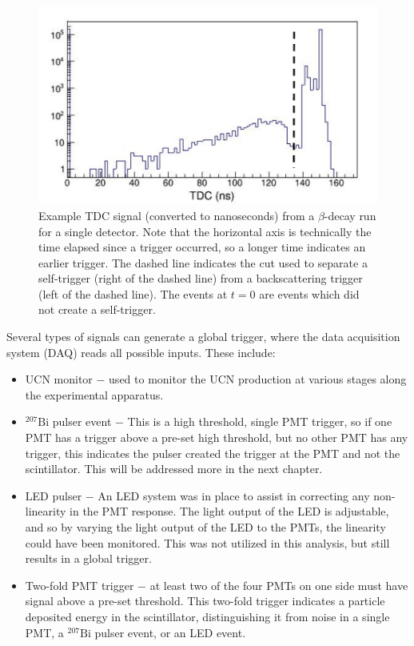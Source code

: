 \begin{figure}
  \centering
  \includegraphics[page=1,scale=0.60]{2-UCNAExperiment/TDCSignal.pdf}
  \caption{Example TDC signal (converted to nanoseconds) from a $\beta$-decay run for a single
    detector.
    Note that the horizontal axis is technically the time elapsed since a trigger occurred,
    so a longer time indicates an earlier
    trigger. The dashed line
    indicates the cut used to separate a self-trigger (right of the dashed line) from a backscattering trigger
    (left of the dashed line).  The events at $t=0$ are events which did not create a self-trigger.}
  \label{fig:TDCsig}
\end{figure}


Several types of signals can generate a global trigger, where the data acquisition system (DAQ)
reads all possible inputs. These include:
%
\begin{itemize}
\item UCN monitor $-$ used to monitor the UCN production at various
  stages along the experimental apparatus.
\item $^{207}\mathrm{Bi}$ pulser event $-$ This is a high threshold, single PMT trigger, so if one PMT
  has a trigger above a pre-set high threshold, but no other PMT has any trigger, this indicates the
  pulser created the trigger at the PMT and not the scintillator. This will be addressed more in the
  next chapter.
\item LED pulser $-$ An LED system was in place to assist in correcting any non-linearity in the
  PMT response. The light output of the LED is adjustable, and so by varying the light output of
  the LED to the PMTs, the linearity could have been monitored.
  This was not utilized in this analysis, but still results in a global trigger.
\item Two-fold PMT trigger $-$ at least two of the four PMTs on one side must have signal above a pre-set
  threshold. This two-fold trigger indicates a particle deposited energy in the scintillator,
  distinguishing it from noise in a single PMT, a $^{207}\mathrm{Bi}$ pulser event, or an LED event.
\end{itemize}


